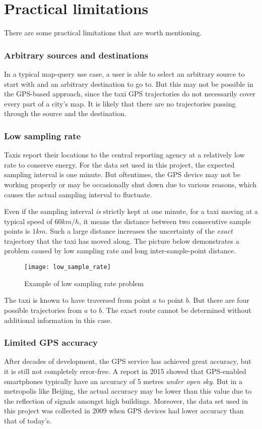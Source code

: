 \section{Practical limitations} \label{Sec:limitation}
There are some practical limitations that are worth mentioning. 
\subsubsection{Arbitrary sources and destinations}
In a typical map-query use case, a user is able to select an arbitrary source to start with and an arbitrary destination to go to. But this may not be possible in the GPS-based approach, since the taxi GPS trajectories do not necessarily cover every part of a city's map. It is likely that there are no trajectories passing through the source and the destination.
\subsubsection{Low sampling rate}
Taxis report their locations to the central reporting agency at a relatively low rate to conserve energy. For the data set used in this project, the expected sampling interval is one minute. But oftentimes, the GPS device may not be working properly or may be occasionally shut down due to various reasons, which causes the actual sampling interval to fluctuate. 

Even if the sampling interval \emph{is} strictly kept at one minute, for a taxi moving at a typical speed of $60km/h$, it means the distance between two consecutive sample points is $1km$. Such a large distance increases the uncertainty of the \emph{exact} trajectory that the taxi has moved along. The picture\cite{TDR10} below demonstrates a problem caused by low sampling rate and long inter-sample-point distance.
\begin{figure}[h]
\texttt{[image: low\_sample\_rate]}
\centering
\caption{Example of low sampling rate problem}
\end{figure}

The taxi is known to have traversed from point $a$ to point $b$. But there are four possible trajectories from $a$ to $b$. The exact route cannot be determined without additional information in this case.
\subsubsection{Limited GPS accuracy}
After decades of development, the GPS service has achieved great accuracy, but it is still not completely error-free. A report\cite{FP15} in 2015 showed that GPS-enabled smartphones typically have an accuracy of 5 metres \emph{under open sky}. But in a metropolis like Beijing, the actual accuracy may be lower than this value due to the reflection of signals amongst high buildings. Moreover, the data set used in this project was collected in 2009 when GPS devices had lower accuracy than that of today's.

